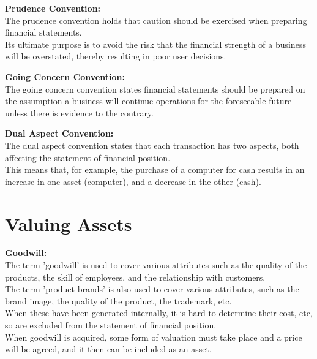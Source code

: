 \documentclass{report}
\newenvironment{blackbox}[1][Black]
  {\begin{tcolorbox}[colframe=#1,colback=white]}
  {\end{tcolorbox}}
\begin{document}
\begin{blackbox}
    \textbf{Prudence Convention:}\\
    The prudence convention holds that caution should be exercised when preparing financial statements.\\
    Its ultimate purpose is to avoid the risk that the financial strength of a business will be overstated, thereby resulting in poor user decisions.
\end{blackbox}

\begin{blackbox}
    \textbf{Going Concern Convention:}\\
    The going concern convention states financial statements should be prepared on the assumption a business will continue operations for the foreseeable future unless there is evidence to the contrary.
\end{blackbox}

\begin{blackbox}
    \textbf{Dual Aspect Convention:}\\
    The dual aspect convention states that each transaction has two aspects, both affecting the statement of financial position.\\
    This means that, for example, the purchase of a computer for cash results in an increase in one asset (computer), and a decrease in the other (cash).
\end{blackbox}

\section{Valuing Assets}

\begin{blackbox}
    \textbf{Goodwill:}\\
    The term 'goodwill' is used to cover various attributes such as the quality of the products, the skill of employees, and the relationship with customers.\\
    The term 'product brands' is also used to cover various attributes, such as the brand image, the quality of the product, the trademark, etc.\\
    When these have been generated internally, it is hard to determine their cost, etc, so are excluded from the statement of financial position.\\
    When goodwill is acquired, some form of valuation must take place and a price will be agreed, and it then can be included as an asset.
\end{blackbox}
\pagebreak
\end{document}
